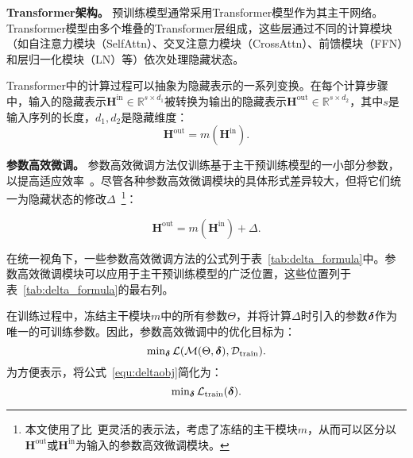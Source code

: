 \textbf{Transformer架构。} 预训练模型通常采用Transformer模型作为其主干网络。Transformer模型由多个堆叠的Transformer层组成，这些层通过不同的计算模块（如自注意力模块（SelfAttn）、交叉注意力模块（CrossAttn）、前馈模块（FFN）和层归一化模块（LN）等）依次处理隐藏状态。

Transformer中的计算过程可以抽象为隐藏表示的一系列变换。在每个计算步骤中，输入的隐藏表示$\mathbf{H}^{\text{in}}\in \mathbb{R}^{s\times d_1}$被转换为输出的隐藏表示$\mathbf{H}^{\text{out}}\in \mathbb{R}^{s\times d_2}$，其中$s$是输入序列的长度，$d_1, d_2$是隐藏维度：
\begin{equation}
    \mathbf{H}^{\text{out}} = m(\mathbf{H}^{\text{in}}).
\end{equation}

\noindent\textbf{参数高效微调。}\label{sec:meth:delta}
参数高效微调方法仅训练基于主干预训练模型的一小部分参数，以提高适应效率~\cite{houlsby2019parameter, pfeiffer2020adapterfusion, zaken2021bitfit, hu2021lora, mahabadi2021compacter,guo2021parameter,li2021prefix,lester2021power}。尽管各种参数高效微调模块的具体形式差异较大，但\citet{he2022unified}将它们统一为隐藏状态的修改$\Delta$~\footnote{本文使用了比~\cite{he2022unified}更灵活的表示法，考虑了冻结的主干模块$m$，从而可以区分以$\mathbf{H}^{\text{out}}$或$\mathbf{H}^{\text{in}}$为输入的参数高效微调模块。}：

\begin{equation}
\label{equ:unifydelta}
    \mathbf{H}^{\text{out}} = m(\mathbf{H}^{\text{in}}) + \Delta.
\end{equation}

在统一视角下，一些参数高效微调方法的公式列于表~\ref{tab:delta_formula}中。参数高效微调模块可以应用于主干预训练模型的广泛位置，这些位置列于表~\ref{tab:delta_formula}的最右列。

在训练过程中，冻结主干模块$m$中的所有参数$\Theta$，并将计算$\Delta$时引入的参数$\boldsymbol{\delta}$作为唯一的可训练参数。因此，参数高效微调中的优化目标为：
\begin{equation}
    \operatorname{min}_{\boldsymbol{\delta}} \mathcal{L}(\mathcal{M}(\Theta, \boldsymbol{\delta}), \mathcal{D}_{\text{train}}). 
\label{equ:deltaobj}
\end{equation}
为方便表示，将公式~\eqref{equ:deltaobj}简化为：
\begin{equation}
        \operatorname{min}_{\boldsymbol{\delta}} \mathcal{L}_{\text{train}}( \boldsymbol{\delta}).
\end{equation}


